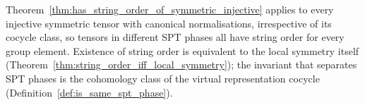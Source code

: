 \begin{remark}%
    \label{rem:string_order_symmetry_diagnostic}
    Theorem~\ref{thm:has_string_order_of_symmetric_injective} applies to
    every injective symmetric tensor with canonical normalisations,
    irrespective of its cocycle class, so tensors in different SPT phases
    all have string order for every group element. Existence of string
    order is equivalent to the local symmetry itself
    (Theorem~\ref{thm:string_order_iff_local_symmetry}); the invariant
    that separates SPT phases is the cohomology class of the virtual
    representation cocycle (Definition~\ref{def:is_same_spt_phase}).
\end{remark}
